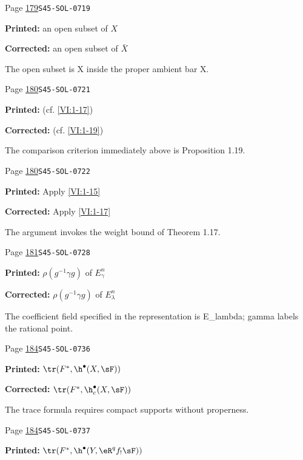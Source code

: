 \begin{description}
\smallskip
\item[\hypertarget{apparatus:EN-0104}{104}] Page \hyperlink{printpage:en:179}{179}\quad\texttt{S45-SOL-0719}
\par\noindent\textbf{Printed:} an open subset of $X$
\par\noindent\textbf{Corrected:} an open subset of $\bar X$
\par\noindent The open subset is X inside the proper ambient bar X.
\smallskip
\item[\hypertarget{apparatus:EN-0105}{105}] Page \hyperlink{printpage:en:180}{180}\quad\texttt{S45-SOL-0721}
\par\noindent\textbf{Printed:} (cf. \ref{VI:1-17})
\par\noindent\textbf{Corrected:} (cf. \ref{VI:1-19})
\par\noindent The comparison criterion immediately above is Proposition 1.19.
\smallskip
\item[\hypertarget{apparatus:EN-0106}{106}] Page \hyperlink{printpage:en:180}{180}\quad\texttt{S45-SOL-0722}
\par\noindent\textbf{Printed:} Apply \ref{VI:1-15}
\par\noindent\textbf{Corrected:} Apply \ref{VI:1-17}
\par\noindent The argument invokes the weight bound of Theorem 1.17.
\smallskip
\item[\hypertarget{apparatus:EN-0107}{107}] Page \hyperlink{printpage:en:181}{181}\quad\texttt{S45-SOL-0728}
\par\noindent\textbf{Printed:} $\rho(g^{-1} \gamma g)$ of $E_\gamma^n$
\par\noindent\textbf{Corrected:} $\rho(g^{-1} \gamma g)$ of $E_\lambda^n$
\par\noindent The coefficient field specified in the representation is E\_lambda; gamma labels the rational point.
\smallskip
\item[\hypertarget{apparatus:EN-0108}{108}] Page \hyperlink{printpage:en:184}{184}\quad\texttt{S45-SOL-0736}
\par\noindent\textbf{Printed:} \(\tr(F^\ast,\h^\bullet(X,\sF))\)
\par\noindent\textbf{Corrected:} \(\tr(F^\ast,\h_c^\bullet(X,\sF))\)
\par\noindent The trace formula requires compact supports without properness.
\smallskip
\item[\hypertarget{apparatus:EN-0109}{109}] Page \hyperlink{printpage:en:184}{184}\quad\texttt{S45-SOL-0737}
\par\noindent\textbf{Printed:} \(\tr(F^\ast, \h^\bullet(Y,\eR^q f_! \sF))\)

\end{description}
